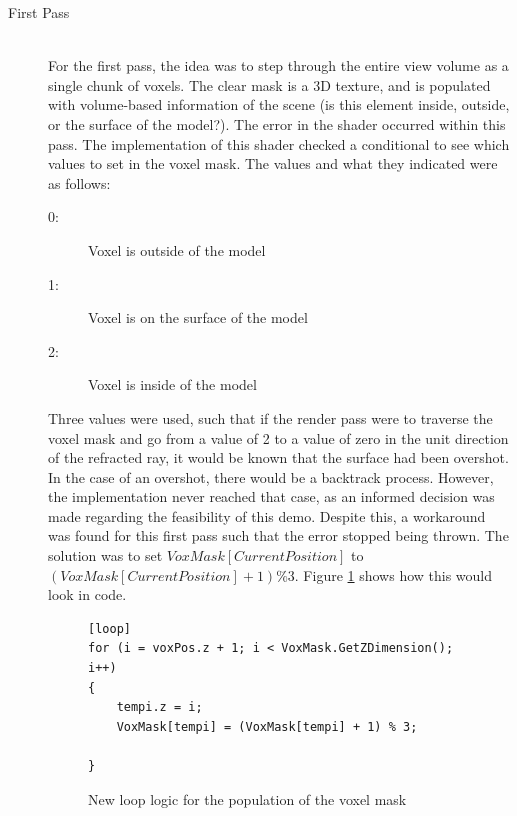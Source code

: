 \documentclass[a4paper, 12pt]{article}
\begin{document}
\begin{description}

\item[First Pass] \hfill \\

For the first pass, the idea was to step through the entire view volume as a
single chunk of voxels. The clear mask is a 3D texture, and is populated with
volume-based information of the scene (is this element inside, outside, or the
surface of the model?). The error in the shader occurred within this pass. The
implementation of this shader checked a conditional to see which values to set
in the voxel mask. The values and what they indicated were as follows:

\begin{description}

\item[0:] Voxel is outside of the model

\item[1:] Voxel is on the surface of the model

\item[2:] Voxel is inside of the model

\end{description}

\noindent Three values were used, such that if the render pass were to
traverse the voxel mask and go from a value of 2 to a value of zero in the
unit direction of the refracted ray, it would be known that the surface had
been overshot. In the case of an overshot, there would be a backtrack process.
However, the implementation never reached that case, as an informed decision
was made regarding the feasibility of this demo. Despite this, a workaround
was found for this first pass such that the error stopped being thrown. The
solution was to set $VoxMask[CurrentPosition]$ to $(VoxMask[CurrentPosition] +
1) \% 3$. Figure \ref{code:VoxMask} shows how this would look in code.

\begin{figure}[!htb]
\begin{lstlisting}[language=HLSL]
[loop]
for (i = voxPos.z + 1; i < VoxMask.GetZDimension(); i++)
{
	tempi.z = i;
	VoxMask[tempi] = (VoxMask[tempi] + 1) % 3;
	
}

\end{lstlisting}
\caption{New loop logic for the population of the voxel mask}
\label{code:VoxMask}
\end{figure}


\end{description}
\end{document}
